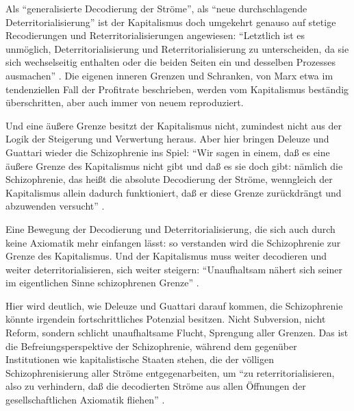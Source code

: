 \documentclass[12pt,
               DIV13,
               paper=a4,
               twoside=false,
               onehalfspacing,
               bibliography=totoc,
               toc=graduated,
               draft,
               ]{scrartcl}
\newcommand{\pc}[2]{\parencite[#1]{#2}}
\newcommand{\dg}{Deleuze und Guattari\xspace}
\begin{document}
Als "`generalisierte Decodierung der Ströme"', als "`neue
durchschlagende Deterritorialisierung"' \pc{288}{ao} ist der
Kapitalismus doch umgekehrt genauso auf stetige Recodierungen und
Reterritorialisierungen angewiesen: "`Letztlich ist es unmöglich,
Deterritorialisierung und Reterritorialisierung zu unterscheiden, da
sie sich wechselseitig enthalten oder die beiden Seiten ein und
desselben Prozesses ausmachen"' \pc{333}{ao}. Die eigenen inneren
Grenzen und Schranken, von Marx etwa im tendenziellen Fall der
Profitrate beschrieben, werden vom Kapitalismus beständig
überschritten, aber auch immer von neuem reproduziert.

Und eine äußere Grenze besitzt der Kapitalismus nicht, zumindest nicht aus
der Logik der Steigerung und Verwertung heraus. Aber hier bringen
Deleuze und Guattari wieder die Schizophrenie ins Spiel: "`Wir sagen
in einem, daß es eine äußere Grenze des Kapitalismus nicht gibt und
daß es sie doch gibt: nämlich die Schizophrenie, das heißt die
absolute Decodierung der Ströme, wenngleich der Kapitalismus allein
dadurch funktioniert, daß er diese Grenze zurückdrängt und abzuwenden
versucht"' \pc{322}{ao}.

Eine Bewegung der Decodierung und Deterritorialisierung, die sich auch
durch keine Axiomatik mehr einfangen lässt: so verstanden wird die
Schizophrenie zur Grenze des Kapitalismus. Und der Kapitalismus muss
weiter decodieren und weiter deterritorialisieren, sich weiter
steigern: "`Unaufhaltsam nähert sich seiner im eigentlichen Sinne
schizophrenen Grenze"' \pc{44}{ao}.

Hier wird deutlich, wie \dg darauf kommen, die Schizophrenie könnte
irgendein fortschrittliches Potenzial besitzen. Nicht Subversion,
nicht Reform, sondern schlicht unaufhaltsame Flucht, Sprengung aller
Grenzen. Das ist die Befreiungsperspektive der Schizophrenie, während
dem gegenüber Institutionen wie kapitalistische Staaten stehen, die
der völligen Schizophrenisierung aller Ströme entgegenarbeiten, um
"`zu reterritorialisieren, also zu verhindern, daß die decodierten
Ströme aus allen Öffnungen der gesellschaftlichen Axiomatik fliehen"'
\pc{332}{ao}.
\end{document}
